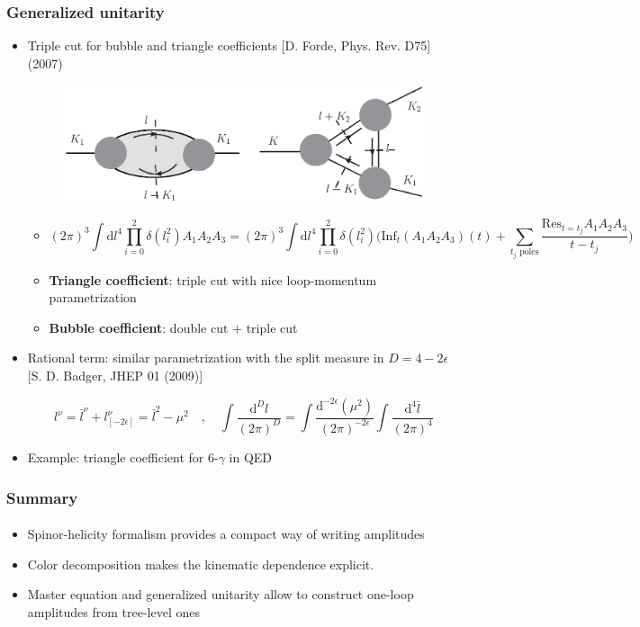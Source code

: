 \documentclass[english]{beamer}
\newcommand{\dd}{\textrm{d}}
\newcommand{\res}{\mathrm{Res}}
\begin{document}
\begin{frame}[shrink=30]
\frametitle{Generalized unitarity}
\begin{itemize}

\item<1-> Triple cut for bubble and triangle coefficients
\tiny\color{blue}
[D. Forde, Phys. Rev. D75]
(2007)
\color{black}\normalsize
\begin{figure}[h]
  \centering
  \includegraphics[width=0.5\linewidth]{triple_cut.eps}
\end{figure}
\begin{itemize}

\item<2->[]
\begin{equation*}
(2\pi)^3\int\dd l^4 \prod_{i=0}^2 \delta(l_i^2) A_1A_2A_3 = 
(2\pi)^3\int\dd l^4 \prod_{i=0}^2 \delta(l_i^2)\Big(\mathrm{Inf}_t(A_1A_2A_3)(t) + \sum_{\textrm{$t_j$ poles}}\frac{\res_{t = t_j}A_1 A_2 A_3}{t-t_j}\Big)
\end{equation*}

\item<3-> \textbf{Triangle coefficient}: triple cut with nice loop-momentum parametrization 
\item<4-> \textbf{Bubble coefficient}: double cut $+$ triple cut
\end{itemize}

\item<5-> Rational term: similar parametrization with the split measure in $D=4-2\epsilon$ \tiny\color{blue}[S. D. Badger, JHEP 01 (2009)]\color{black}\normalsize

\begin{equation*}
l^\nu = \bar{l}^\nu + l_{[-2\epsilon]}^\nu = \bar{l}^2 - \mu^2
\quad,\quad
\int\frac{\dd^D l}{(2\pi)^D} = 
\int\frac{\dd^{-2\epsilon}(\mu^2)}{(2\pi)^{-2\epsilon}}\int\frac{\dd^4 \bar{l}}{(2\pi)^4}
\end{equation*}

\item<6-> Example: triangle coefficient for 6-$\gamma$ in QED

\end{itemize}

\end{frame}
\begin{frame}
\frametitle{Summary}
\framesubtitle{}
\begin{itemize}
\item<1-> Spinor-helicity formalism provides a compact way of writing amplitudes
\item<2-> Color decomposition makes the kinematic dependence explicit.
\item<3-> Master equation and generalized unitarity allow to construct one-loop amplitudes from tree-level ones

\end{itemize}

\end{frame}
\end{document}
